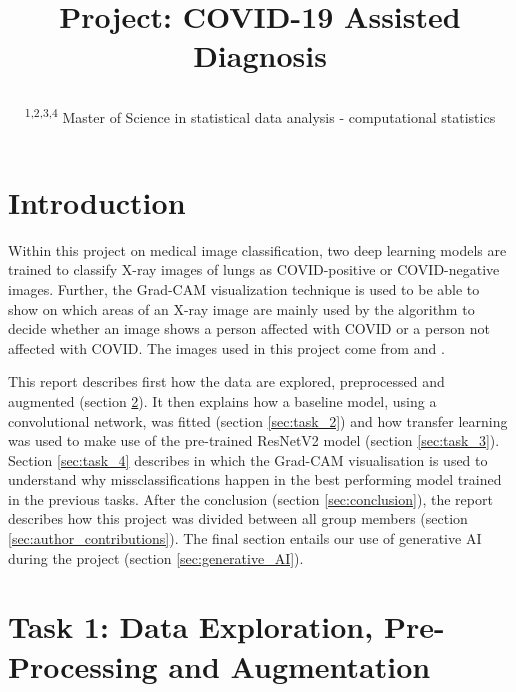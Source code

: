 \documentclass[conference]{IEEEtran}
\begin{document}
\title{Project: COVID-19 Assisted Diagnosis\\


\author{
\and
{}
\and
{}
\and
{}

\and


\textsuperscript{1,2,3,4}  Master of Science in statistical data analysis - computational statistics\hfill}}

\maketitle



\section{Introduction}
Within this project on medical image classification, two deep learning models are trained to classify X-ray images of lungs as COVID-positive or COVID-negative images. Further, the Grad-CAM visualization technique is used to be able to show on which areas of an X-ray image are mainly used by the algorithm to decide whether an image shows a person affected with COVID or a person not affected with COVID. The images used in this project come from \cite{dataset1} and \cite{dataset2}. 

This report describes first how the data are explored, preprocessed and augmented (section \ref{sec:task_1}). It then explains how a baseline model, using a convolutional network, was fitted (section \ref{sec:task_2}) and how transfer learning was used to make use of the pre-trained ResNetV2 model (section \ref{sec:task_3}). Section \ref{sec:task_4} describes in which the Grad-CAM visualisation is used to understand why missclassifications happen in the best performing model trained in the previous tasks.
After the conclusion (section \ref{sec:conclusion}), the report describes how this project was divided between all group members (section \ref{sec:author_contributions}). The final section entails our use of generative AI during the project (section \ref{sec:generative_AI}).


\section{Task 1: Data Exploration, Pre-Processing and Augmentation}\label{sec:task_1}
\end{document}
